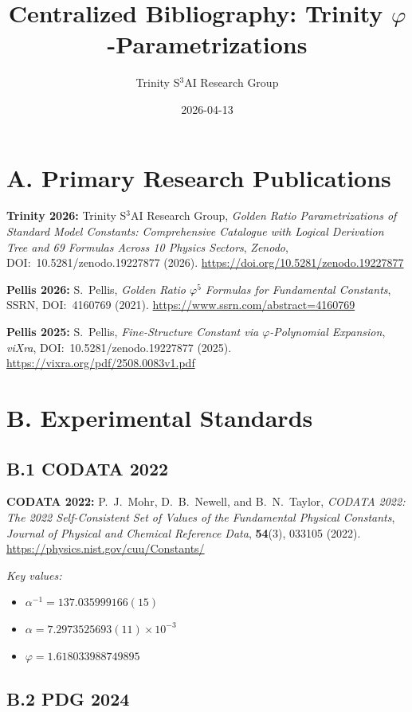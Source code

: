 \documentclass[10pt,a4paper]{article}
\title{Centralized Bibliography: Trinity $\varphi$-Parametrizations}
\author{Trinity S$^3$AI Research Group}
\date{2026-04-13}
\begin{document}
\maketitle

\section*{A. Primary Research Publications}

\noindent\textbf{Trinity 2026:} Trinity S$^3$AI Research Group, \textit{Golden Ratio Parametrizations of Standard Model Constants: Comprehensive Catalogue with Logical Derivation Tree and 69 Formulas Across 10 Physics Sectors}, \textit{Zenodo}, DOI:~10.5281/zenodo.19227877 (2026). \url{https://doi.org/10.5281/zenodo.19227877}

\noindent\textbf{Pellis 2026:} S.~Pellis, \textit{Golden Ratio $\varphi^5$ Formulas for Fundamental Constants}, SSRN, DOI:~4160769 (2021). \url{https://www.ssrn.com/abstract=4160769}

\noindent\textbf{Pellis 2025:} S.~Pellis, \textit{Fine-Structure Constant via $\varphi$-Polynomial Expansion}, \textit{viXra}, DOI:~10.5281/zenodo.19227877 (2025). \url{https://vixra.org/pdf/2508.0083v1.pdf}

\section*{B. Experimental Standards}

\subsection*{B.1 CODATA 2022}

\noindent\textbf{CODATA 2022:} P.~J.~Mohr, D.~B.~Newell, and B.~N.~Taylor, \textit{CODATA 2022: The 2022 Self-Consistent Set of Values of the Fundamental Physical Constants}, \textit{Journal of Physical and Chemical Reference Data}, \textbf{54}(3), 033105 (2022). \url{https://physics.nist.gov/cuu/Constants/}

\textit{Key values:}
\begin{itemize}
  \item $\alpha^{-1} = 137.035999166(15)$
  \item $\alpha = 7.2973525693(11) \times 10^{-3}$
  \item $\varphi = 1.618033988749895$
\end{itemize}

\subsection*{B.2 PDG 2024}
\end{document}

